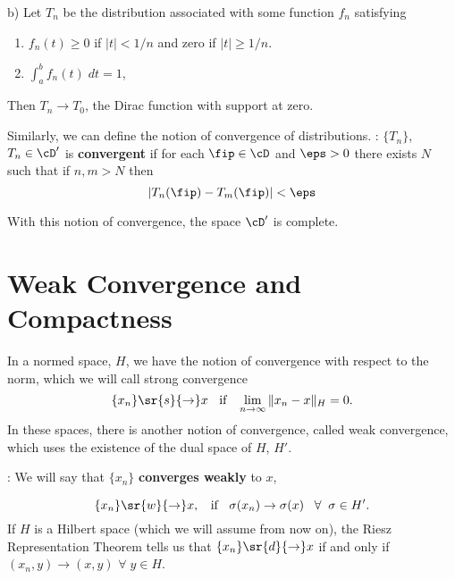 \noi 
b) Let $T_n$ be the distribution associated with some function $f_n$ 
satisfying
\begin{enumerate}
\item $f_n(t)\geq0$ if $|t|<1/n$ and zero if $|t|\geq1/n$.
\item $\int_a^b f_n(t)\;dt=1$,
\end{enumerate}
Then $T_n\to T_0$, the Dirac function with support at zero.

\espa
Similarly, we can define the notion of convergence of
distributions. 
\espa
{}:
$\{T_n\}$, $T_n\in\cD'$ is {\bf convergent} if for each 
$\fip\in\cD$ and $\eps>0$ there exists $N$ such that if $n,m>N$ then
$$ |T_n(\fip)-T_m(\fip)|<\eps$$

\noi With this notion of convergence, the space $\cD'$ is complete.
 
\section{Weak Convergence and Compactness}

In a normed space, $H$, we have the notion of convergence with respect
to the norm, which we will call strong convergence
\[
\{x_n\} \sr{s}{\rightarrow} x \;\; \mbox{ if } \;\;\lim_{n \to \infty} \|x_n - x\|_H = 0.
\]
% 
In these spaces, there is another notion of convergence, called weak convergence,
which uses the existence of the dual space of $H$, $H'$.

\espa
\noi
 : 
We will say that $\{x_n\}$ {\bf converges weakly} to $x$,

\[
\{x_n\} \sr{w}{\rightarrow} x, \;\; \mbox{ if } \;\; \sigma(x_n) \rightarrow \sigma(x) \;\;\; \forall \;\; \sigma \in H'.
\]
%
If $H$ is a Hilbert space (which we will assume from now on),
the Riesz Representation Theorem tells us that $\{x_n\}\sr{d}{\rightarrow}
x$ if and only if $(x_n,y) \rightarrow (x,y)$  $ \forall \;y \in H$.


